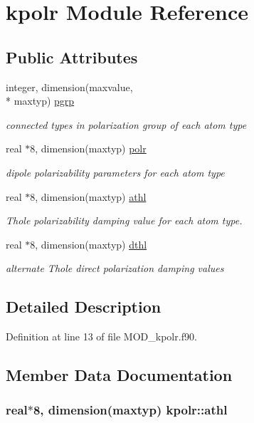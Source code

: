 \hypertarget{classkpolr}{\section{kpolr Module Reference}
\label{classkpolr}
}
\subsection*{Public Attributes}
\begin{DoxyCompactItemize}
\item 
integer, dimension(maxvalue, \\*
maxtyp) \hyperlink{classkpolr_a0e53a03241862e10a4c2075bf131a8a6}{pgrp}
\begin{DoxyCompactList}\small\item\em connected types in polarization group of each atom type \end{DoxyCompactList}\item 
real $\ast$8, dimension(maxtyp) \hyperlink{classkpolr_a2815e5ccaabe2b56f7e6de72e0c52ed3}{polr}
\begin{DoxyCompactList}\small\item\em dipole polarizability parameters for each atom type \end{DoxyCompactList}\item 
real $\ast$8, dimension(maxtyp) \hyperlink{classkpolr_a35d2add9b780831bc62fe68ca9cc23c8}{athl}
\begin{DoxyCompactList}\small\item\em Thole polarizability damping value for each atom type. \end{DoxyCompactList}\item 
real $\ast$8, dimension(maxtyp) \hyperlink{classkpolr_a4677ab2a3c6caf2953976d7715cc8d62}{dthl}
\begin{DoxyCompactList}\small\item\em alternate Thole direct polarization damping values \end{DoxyCompactList}\end{DoxyCompactItemize}


\subsection{Detailed Description}


Definition at line 13 of file M\-O\-D\-\_\-kpolr.\-f90.



\subsection{Member Data Documentation}
\hypertarget{classkpolr_a35d2add9b780831bc62fe68ca9cc23c8}{
\subsubsection[{athl}]{\setlength{\rightskip}{0pt plus 5cm}real$\ast$8, dimension(maxtyp) kpolr\-::athl}}\label{classkpolr_a35d2add9b780831bc62fe68ca9cc23c8}


